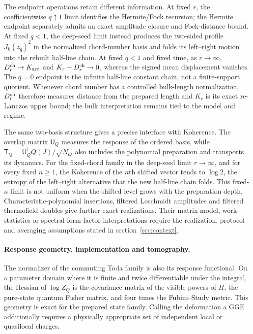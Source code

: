 \documentclass[a4paper,11pt]{article}
\def\Jac{J}%
\theoremstyle{definition}
\theoremstyle{remark}
\newcommand{\Jac}{\mathsf J}
\begin{document}
The endpoint operations retain different information.  At fixed $r$, the coefficientwise
$q\uparrow1$ limit identifies the Hermite/Fock recursion; the Hermite endpoint separately admits
an exact amplitude closure and Fock-distance  bound.  At fixed $q<1$, the deep-seed limit instead produces
the two-sided profile $J_k(z_q)^2$ in the normalized chord-number
basis and folds its left--right motion into the rebuilt half-line chain.  At fixed $q<1$ and fixed time, as $r\to\infty$,
$D_r^{\rm ch}\to K_{\rm arc}$ and $K_r-D_r^{\rm ch}\to0$, whereas the signed mean displacement
vanishes.  The $q=0$ endpoint is the infinite half-line constant chain, not a finite-support
quotient.  Whenever chord number has a controlled bulk-length normalization, $D_r^{\rm ch}$
therefore measures distance from the prepared length and $K_r$ is its exact re-Lanczos upper
bound; the bulk interpretation remains tied to the model and regime.

The same two-basis structure gives a precise interface with Koherence.  The overlap matrix
$\mathsf U_Q$ measures the response of the ordered basis, while
$\mathsf T_Q=\mathsf U_Q^\dagger Q(\Jac)/\sqrt{N_Q}$ also includes the polynomial preparation and
transports its dynamics.  For the fixed-chord family in the deep-seed limit $r\to\infty$, and for every fixed $n\ge1$, the Koherence of the
$n$th shifted vector tends to $\log2$, the entropy of the left--right alternative that the new
half-line chain folds.  This fixed-$n$ limit is not uniform when the shifted level grows with the
preparation depth.
Characteristic-polynomial insertions, filtered Loschmidt amplitudes and filtered thermofield
doubles give further exact realizations.  Their matrix-model, work-statistics or spectral-form-factor interpretations require the realization, protocol and averaging assumptions stated in
section~\ref{sec:context}.

\paragraph{Response geometry, implementation and tomography.}
The normalizer of the commuting Toda family is also its response functional.  On a parameter
domain where it is finite and twice differentiable under the integral, the Hessian of $\log Z_Q$ is the covariance matrix of the visible powers of
$H$, the pure-state quantum Fisher matrix, and four times the Fubini--Study metric.  This geometry
is exact for the prepared state family.  Calling the deformation a GGE additionally requires a
physically appropriate set of independent local or quasilocal charges.
\end{document}
